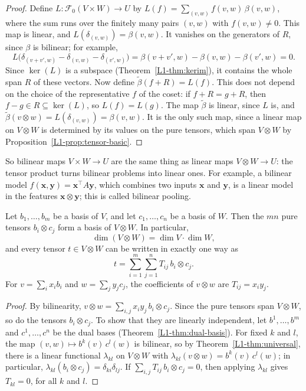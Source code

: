 \begin{proof}
    Define $L: \mathcal{F}_0(V \times W) \to U$ by $L(f) = \sum_{(v, w)} f(v, w)\,\beta(v, w)$, where the sum runs over the finitely many pairs $(v, w)$ with $f(v, w) \neq 0$. This map is linear, and $L(\delta_{(v, w)}) = \beta(v, w)$. It vanishes on the generators of $R$, since $\beta$ is bilinear; for example,
    \[L\big(\delta_{(v + v', w)} - \delta_{(v, w)} - \delta_{(v', w)}\big) = \beta(v + v', w) - \beta(v, w) - \beta(v', w) = 0.\]
    Since $\ker(L)$ is a subspace (Theorem~\ref{L1-thm:kerim}), it contains the whole span $R$ of these vectors. Now define $\tilde\beta(f + R) = L(f)$. This does not depend on the choice of the representative $f$ of the coset: if $f + R = g + R$, then $f - g \in R \subseteq \ker(L)$, so $L(f) = L(g)$. The map $\tilde\beta$ is linear, since $L$ is, and $\tilde\beta(v \otimes w) = L(\delta_{(v, w)}) = \beta(v, w)$. It is the only such map, since a linear map on $V \otimes W$ is determined by its values on the pure tensors, which span $V \otimes W$ by Proposition~\ref{L1-prop:tensor-basic}.
\end{proof}

So bilinear maps $V \times W \to U$ are the same thing as linear maps $V \otimes W \to U$: the tensor product turns bilinear problems into linear ones. For example, a bilinear model $f(\mathbf{x}, \mathbf{y}) = \mathbf{x}^\top A\mathbf{y}$, which combines two inputs $\mathbf{x}$ and $\mathbf{y}$, is a linear model in the features $\mathbf{x} \otimes \mathbf{y}$; this is called bilinear pooling.

\begin{theorem}\label{L1-thm:tensor-basis}
    Let $b_1, \ldots, b_m$ be a basis of $V$, and let $c_1, \ldots, c_n$ be a basis of $W$. Then the $mn$ pure tensors $b_i \otimes c_j$ form a basis of $V \otimes W$. In particular,
    \[\dim(V \otimes W) = \dim V \cdot \dim W,\]
    and every tensor $t \in V \otimes W$ can be written in exactly one way as
    \[t = \sum_{i=1}^m \sum_{j=1}^n T_{ij}\, b_i \otimes c_j.\]
    For $v = \sum_i x_ib_i$ and $w = \sum_j y_jc_j$, the coefficients of $v \otimes w$ are $T_{ij} = x_iy_j$.
\end{theorem}

\begin{proof}
    By bilinearity, $v \otimes w = \sum_{i,j} x_iy_j\, b_i \otimes c_j$. Since the pure tensors span $V \otimes W$, so do the tensors $b_i \otimes c_j$. To show that they are linearly independent, let $b^1, \ldots, b^m$ and $c^1, \ldots, c^n$ be the dual bases (Theorem~\ref{L1-thm:dual-basis}). For fixed $k$ and $l$, the map $(v, w) \mapsto b^k(v)\,c^l(w)$ is bilinear, so by Theorem~\ref{L1-thm:universal}, there is a linear functional $\lambda_{kl}$ on $V \otimes W$ with $\lambda_{kl}(v \otimes w) = b^k(v)\,c^l(w)$; in particular, $\lambda_{kl}(b_i \otimes c_j) = \delta_{ki}\delta_{lj}$. If $\sum_{i,j} T_{ij}\, b_i \otimes c_j = 0$, then applying $\lambda_{kl}$ gives $T_{kl} = 0$, for all $k$ and $l$.
\end{proof}

